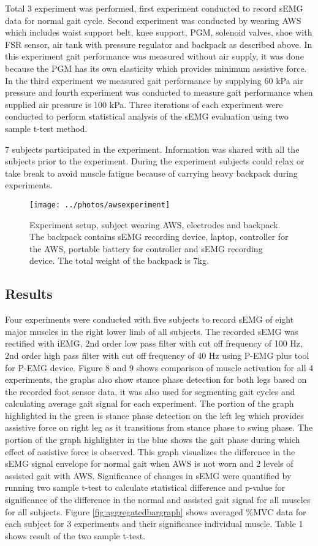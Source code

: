 \documentclass[letterpaper, 10 pt, conference]{ieeeconf}  %
\begin{document}
Total 3 experiment was performed, first experiment conducted to record sEMG data for normal gait cycle. Second experiment was conducted by wearing AWS which includes waist support belt, knee support, PGM, solenoid valves, shoe with FSR sensor, air tank with pressure regulator and backpack as described above. In this experiment gait performance was measured without air supply, it was done because the PGM has its own elasticity which provides minimum assistive force. In the third experiment we measured gait performance by supplying 60 kPa air pressure and fourth experiment was conducted to measure gait performance when supplied air pressure is 100 kPa. Three iterations of each experiment were conducted to perform statistical analysis of the sEMG evaluation using two sample t-test method.  

7 subjects participated in the experiment. Information was shared with all the subjects prior to the experiment. During the experiment subjects could relax or take break to avoid muscle fatigue because of carrying heavy backpack during experiments.


\begin{figure}
	\centering
	\texttt{[image: ../photos/awsexperiment]}
	\caption{Experiment setup, subject wearing AWS, electrodes and backpack. The backpack contains sEMG recording device, laptop, controller for the AWS, portable battery for controller and sEMG recording device. The total weight of the backpack is 7kg.}
	\label{fig:experimentsetup}
\end{figure}

\subsection{Results}

Four experiments were conducted with five subjects to record sEMG of eight major muscles in the right lower limb of all subjects. The recorded sEMG was rectified with iEMG, 2nd order low pass filter with cut off frequency of 100 Hz, 2nd order high pass filter with cut off frequency of 40 Hz using P-EMG plus tool for P-EMG device. Figure 8 and 9 shows comparison of muscle activation for all 4 experiments, the graphs also show stance phase detection for both legs based on the recorded foot sensor data, it was also used for segmenting gait cycles and calculating average gait signal for each experiment.  The portion of the graph highlighted in the green is stance phase detection on the left leg which provides assistive force on right leg as it transitions  from stance phase to swing phase. The portion of the graph highlighter in the blue shows the gait phase during which effect of assistive force is observed. This graph visualizes the difference in the sEMG signal envelope for normal gait when AWS is not worn and 2 levels of assisted gait with AWS. Significance of  changes in sEMG were quantified by running two sample t-test to calculate statistical difference and p-value for significance of the difference in the normal and assisted gait signal for all muscles for all subjects. Figure \ref{fig:aggregatedbargraph} shows averaged \%MVC data for each subject for 3 experiments and their significance individual muscle. Table 1 shows result of the two sample t-test.
\end{document}
